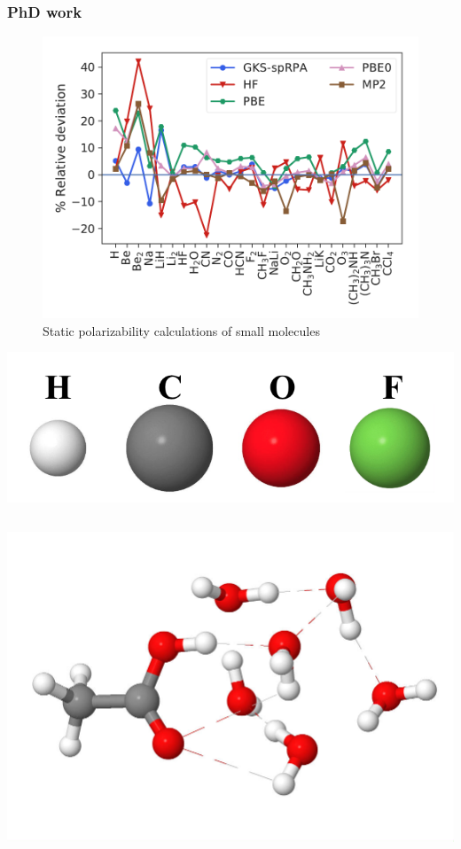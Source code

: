 \documentclass{beamer}
\begin{document}
\begin{frame}
\frametitle{PhD work}
\begin{block}{}
\begin{figure}
\includegraphics[scale=0.27]{figures/f12_errors.pdf}
\vspace*{-0.4cm}
\caption{Static polarizability calculations of small molecules}
\end{figure}
\end{block}
\begin{block}{}
\begin{center}
\includegraphics[scale=0.07]{figures/label_1.png}
\end{center}
\pause
\vspace*{-0.5cm}
\begin{columns}
\begin{center}
\includegraphics[scale=0.06]{figures/6water_acetic.jpg}
\end{center}


\end{columns}
\end{block}
\end{frame}
\end{document}
